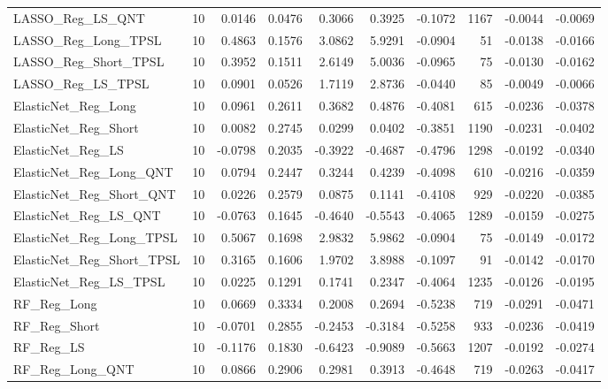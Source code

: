 \begin{tabular}{llrrrrrrrr}
\cline{1-10}
LASSO\_Reg\_LS\_QNT & 10 & 0.0146 & 0.0476 & 0.3066 & 0.3925 & -0.1072 & 1167 & -0.0044 & -0.0069 \\
\cline{1-10}
LASSO\_Reg\_Long\_TPSL & 10 & 0.4863 & 0.1576 & 3.0862 & 5.9291 & -0.0904 & 51 & -0.0138 & -0.0166 \\
\cline{1-10}
LASSO\_Reg\_Short\_TPSL & 10 & 0.3952 & 0.1511 & 2.6149 & 5.0036 & -0.0965 & 75 & -0.0130 & -0.0162 \\
\cline{1-10}
LASSO\_Reg\_LS\_TPSL & 10 & 0.0901 & 0.0526 & 1.7119 & 2.8736 & -0.0440 & 85 & -0.0049 & -0.0066 \\
\cline{1-10}
ElasticNet\_Reg\_Long & 10 & 0.0961 & 0.2611 & 0.3682 & 0.4876 & -0.4081 & 615 & -0.0236 & -0.0378 \\
\cline{1-10}
ElasticNet\_Reg\_Short & 10 & 0.0082 & 0.2745 & 0.0299 & 0.0402 & -0.3851 & 1190 & -0.0231 & -0.0402 \\
\cline{1-10}
ElasticNet\_Reg\_LS & 10 & -0.0798 & 0.2035 & -0.3922 & -0.4687 & -0.4796 & 1298 & -0.0192 & -0.0340 \\
\cline{1-10}
ElasticNet\_Reg\_Long\_QNT & 10 & 0.0794 & 0.2447 & 0.3244 & 0.4239 & -0.4098 & 610 & -0.0216 & -0.0359 \\
\cline{1-10}
ElasticNet\_Reg\_Short\_QNT & 10 & 0.0226 & 0.2579 & 0.0875 & 0.1141 & -0.4108 & 929 & -0.0220 & -0.0385 \\
\cline{1-10}
ElasticNet\_Reg\_LS\_QNT & 10 & -0.0763 & 0.1645 & -0.4640 & -0.5543 & -0.4065 & 1289 & -0.0159 & -0.0275 \\
\cline{1-10}
ElasticNet\_Reg\_Long\_TPSL & 10 & 0.5067 & 0.1698 & 2.9832 & 5.9862 & -0.0904 & 75 & -0.0149 & -0.0172 \\
\cline{1-10}
ElasticNet\_Reg\_Short\_TPSL & 10 & 0.3165 & 0.1606 & 1.9702 & 3.8988 & -0.1097 & 91 & -0.0142 & -0.0170 \\
\cline{1-10}
ElasticNet\_Reg\_LS\_TPSL & 10 & 0.0225 & 0.1291 & 0.1741 & 0.2347 & -0.4064 & 1235 & -0.0126 & -0.0195 \\
\cline{1-10}
RF\_Reg\_Long & 10 & 0.0669 & 0.3334 & 0.2008 & 0.2694 & -0.5238 & 719 & -0.0291 & -0.0471 \\
\cline{1-10}
RF\_Reg\_Short & 10 & -0.0701 & 0.2855 & -0.2453 & -0.3184 & -0.5258 & 933 & -0.0236 & -0.0419 \\
\cline{1-10}
RF\_Reg\_LS & 10 & -0.1176 & 0.1830 & -0.6423 & -0.9089 & -0.5663 & 1207 & -0.0192 & -0.0274 \\
\cline{1-10}
RF\_Reg\_Long\_QNT & 10 & 0.0866 & 0.2906 & 0.2981 & 0.3913 & -0.4648 & 719 & -0.0263 & -0.0417 \\

\end{tabular}
